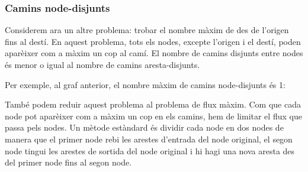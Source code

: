 \subsubsection{Camins node-disjunts}

Considerem ara un altre problema: trobar el nombre màxim de
 des de l'origen fins al destí. En aquest
problema, tots els nodes, excepte l'origen i el destí, poden aparèixer
com a màxim un cop al camí. El nombre de camins disjunts entre nodes
és menor o igual al nombre de camins aresta-disjunts.

Per exemple, al graf anterior, el nombre màxim de camins node-disjunts
és 1:


\begin{center}
\end{center}


També podem reduir aquest problema al problema de flux màxim. Com que
cada node pot aparèixer com a màxim un cop en els camins, hem de
limitar el flux que passa pels nodes. Un mètode estàndard és dividir
cada node en dos nodes de manera que el primer node rebi les arestes
d'entrada del node original, el segon node tingui les arestes de
sortida del node original i hi hagi una nova aresta des del primer
node fins al segon node.

